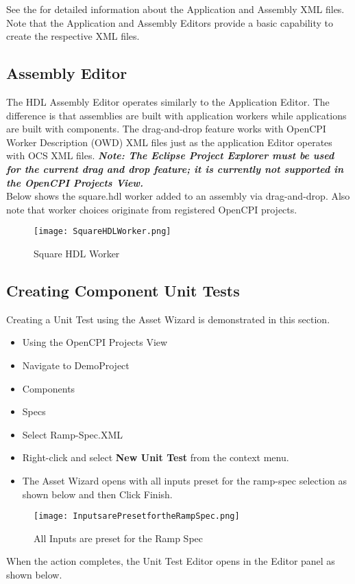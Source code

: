 \documentclass[10pt, a4paper, oneside]{article}
\begin{document}
See the  for detailed information about the Application and Assembly XML files.
Note that the Application and Assembly Editors provide a basic capability to create the respective XML files.
\subsection{Assembly Editor}
The HDL Assembly Editor operates similarly to the Application Editor. The difference is that assemblies are built with application workers while applications are built with components. The drag-and-drop feature works with OpenCPI Worker Description (OWD) XML files just as the application Editor operates with OCS XML files. \textbf{\emph{Note: The Eclipse Project Explorer must be used for the current drag and drop feature; it is currently not supported in the OpenCPI Projects View.}}\\
Below shows the square.hdl worker added to an assembly via drag-and-drop. Also note that worker choices originate from registered OpenCPI projects.
\begin{figure}[h!]
	\centering
	\caption{Square HDL Worker}{}
	\texttt{[image: SquareHDLWorker.png]}
 \end{figure}
\subsection{Creating Component Unit Tests}
Creating a Unit Test using the Asset Wizard is demonstrated in this section.
\begin{itemize}
\item	Using the OpenCPI Projects View
\item	Navigate to DemoProject
\item	Components
\item	Specs
\item	Select Ramp-Spec.XML
\item	Right-click and select \textbf{New Unit Test} from the context menu.
\item The Asset Wizard opens with all inputs preset for the ramp-spec selection as shown below and then Click Finish.
\end{itemize}
\begin{figure}[h!]
	\centering
	\caption{All Inputs are preset for the Ramp Spec}{}
	\texttt{[image: InputsarePresetfortheRampSpec.png]}
 \end{figure}
When the action completes, the Unit Test Editor opens in the Editor panel as shown below. \\
\end{document}
